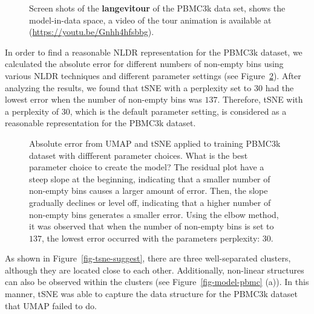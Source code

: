 \documentclass[
  12pt]{article}
\begin{document}
\begin{figure}[H]
\begin{minipage}{0.33\linewidth}
{}

\subcaption{\label{fig-pbmc1_sc3}}

\end{minipage}%

\caption{\label{fig-pbmc1_sc}Screen shots of the \textbf{langevitour} of
the PBMC3k data set, shows the model-in-data space, a video of the tour
animation is available at (\url{https://youtu.be/Gnhh4hfsbbg}).}

\end{figure}%

In order to find a reasonable NLDR representation for the PBMC3k
dataset, we calculated the absolute error for different numbers of
non-empty bins using various NLDR techniques and different parameter
settings (see Figure~\ref{fig-pbmc-abserror}). After analyzing the
results, we found that tSNE with a perplexity set to \(30\) had the
lowest error when the number of non-empty bins was \(137\). Therefore,
tSNE with a perplexity of \(30\), which is the default parameter
setting, is considered as a reasonable representation for the PBMC3k
dataset.

\begin{figure}[H]


\caption{\label{fig-pbmc-abserror}Absolute error from UMAP and tSNE
applied to training PBMC3k dataset with diffferent parameter choices.
What is the best parameter choice to create the model? The residual plot
have a steep slope at the beginning, indicating that a smaller number of
non-empty bins causes a larger amount of error. Then, the slope
gradually declines or level off, indicating that a higher number of
non-empty bins generates a smaller error. Using the elbow method, it was
observed that when the number of non-empty bins is set to \(137\), the
lowest error occurred with the parameters perplexity: \(30\).}

\end{figure}%

As shown in Figure~\ref{fig-tsne-suggest}, there are three
well-separated clusters, although they are located close to each other.
Additionally, non-linear structures can also be observed within the
clusters (see Figure~\ref{fig-model-pbmc} (a)). In this manner, tSNE was
able to capture the data structure for the PBMC3k dataset that UMAP
failed to do.
\end{document}
